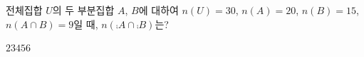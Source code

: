 전체집합 $U$의 두 부분집합 $A$, $B$에 대하여 $n(U)=30$, $n(A)=20$, $n(B)=15$, $n(A\cap B)=9$일 때, $n(\comp{A}\cap\comp{B})$는?
\begin{choices32}{$2$}{$3$}{$4$}{$5$}{$6$}\end{choices32}
